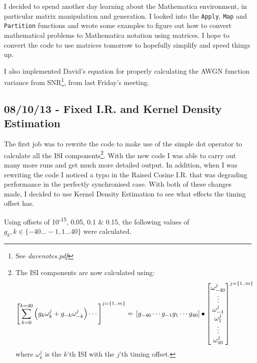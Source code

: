 I decided to spend another day learning about the Mathematica
environment, in particular matrix manipulation and generation. I looked
into the \texttt{Apply}, \texttt{Map} and \texttt{Partition} functions
and wrote some examples to figure out how to convert mathematical
problems to Mathematica notation using matrices. I hope to convert the
code to use matrices tomorrow to hopefully simplify and speed things up.

I also implemented David's equation for properly calculating the AWGN
function variance from SNR\footnote{See \emph{davenotes.pdf}}, from last
Friday's meeting.

\subsection{08/10/13 - Fixed I.R. and Kernel Density Estimation}

The first job was to rewrite the code to make use of the simple dot
operator to calculate all the ISI components\footnote{The ISI components
  are now calculated using: \[
  \left [
    \sum_{k=0}^{k=40} \left ( g_k \omega_k^j + g_{-k} \omega_{-k}^j \right ) \cdots
  \right ]^{j=\{1..m\}} = \\
\left [ 
    g_{-40} \cdots g_{-1} g_{1} \cdots g_{40}
  \right ] \bullet \left [
    \begin{matrix}
  \omega_{-40}^j  \\
  \vdots          \\
  \omega_{-1}^j   \\
  \omega_{1}^j     \\
  \vdots            \\
  \omega_{40}^j    \\
    \end{matrix}
  \right ]^{j=\{1..m\}}
  \] where $\omega_{k}^j$ is the $k$'th ISI with the $j$'th timing
  offset.}. With the new code I was able to carry out many more runs and
get much more detailed output. In addition, when I was rewriting the
code I noticed a typo in the Raised Cosine I.R. that was degrading
performance in the perfectly synchronised case. With both of these
changes made, I decided to use Kernel Density Estimation to see what
effects the timing offset has.

Using offsets of 10\textsuperscript{-15}, 0.05, 0.1 \& 0.15, the
following values of $g_k, k \in \{ -40 \dots -1, 1 \dots 40 \}$ were
calculated.


